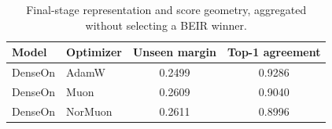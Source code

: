 \begin{table}[t]
\centering
\small
\begin{tabular}{llcc}
\toprule
Model & Optimizer & Unseen margin & Top-1 agreement \\
\midrule
DenseOn & AdamW & 0.2499 & 0.9286 \\
DenseOn & Muon & 0.2609 & 0.9040 \\
DenseOn & NorMuon & 0.2611 & 0.8996 \\
\bottomrule
\end{tabular}
\caption{Final-stage representation and score geometry, aggregated without selecting a BEIR winner.}
\label{tab:representation-results}
\end{table}
